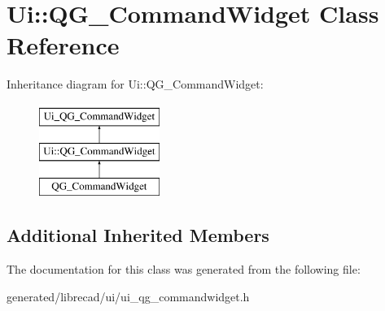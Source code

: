 \hypertarget{classUi_1_1QG__CommandWidget}{\section{Ui\-:\-:Q\-G\-\_\-\-Command\-Widget Class Reference}
\label{classUi_1_1QG__CommandWidget}
}
Inheritance diagram for Ui\-:\-:Q\-G\-\_\-\-Command\-Widget\-:\begin{figure}[H]
\begin{center}
\leavevmode
\includegraphics[height=3.000000cm]{classUi_1_1QG__CommandWidget}
\end{center}
\end{figure}
\subsection*{Additional Inherited Members}


The documentation for this class was generated from the following file\-:\begin{DoxyCompactItemize}
\item 
generated/librecad/ui/ui\-\_\-qg\-\_\-commandwidget.\-h\end{DoxyCompactItemize}
